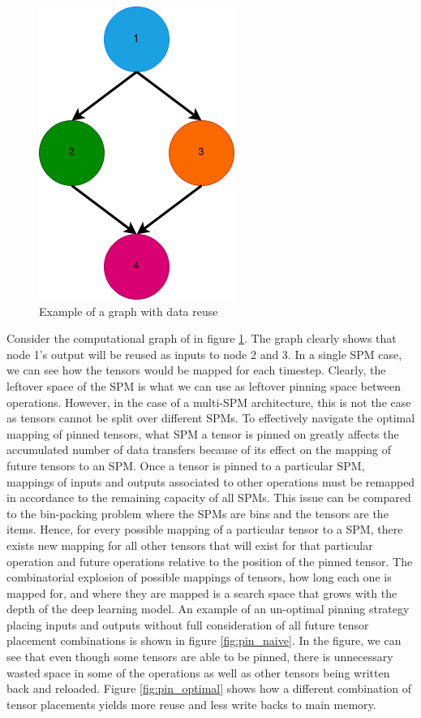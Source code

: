 
\begin{figure}[thb!]
\centering
\includegraphics[scale=0.7]{Figures/reuse_example_graph.png}
\decoRule
\caption[reuseGraph]{Example of a graph with data reuse}
\label{fig:reuseGraph}
\end{figure}

Consider the computational graph of in figure \ref{fig:reuseGraph}. The graph clearly shows that
node 1's output will be reused as inputs to node 2 and 3. In a single SPM case,
we can see how the tensors would be mapped for each timestep. Clearly, the
leftover space of the SPM is what we can use as leftover pinning space between
operations. However, in the case of a multi-SPM architecture, this is not the
case as tensors cannot be split over different SPMs. To effectively navigate
the optimal mapping of pinned tensors, what SPM a tensor is pinned on greatly
affects the accumulated number of data transfers because of its effect on the
mapping of future tensors to an SPM. Once a tensor is pinned to a particular
SPM, mappings of inputs and outputs associated to other operations must be
remapped in accordance to the remaining capacity of all SPMs. This issue can be
compared to the bin-packing problem where the SPMs are bins and the tensors are
the items. Hence, for every possible mapping of a particular tensor to a SPM,
there exists new mapping for all other tensors that will exist for that
particular operation and future operations relative to the position of the
pinned tensor. The combinatorial explosion of possible mappings of tensors,
how long each one is mapped for, and where they are mapped is a search space
that grows with the depth of the deep learning model. An example of 
an un-optimal pinning strategy placing inputs and outputs without full consideration
of all future tensor placement combinations is shown in figure \ref{fig:pin_naive}.
In the figure, we can see that even though some tensors are able to be pinned,
there is unnecessary wasted space in some of the operations as well as other tensors
being written back and reloaded. Figure \ref{fig:pin_optimal} shows how a different
combination of tensor placements yields more reuse and less write backs to main
memory.

